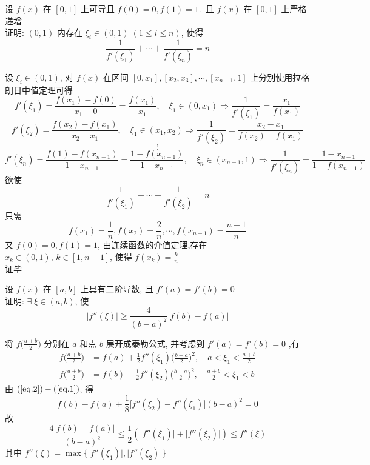 \documentclass[color=green,titlestyle=hang]{elegantbook}%
\begin{document}
\begin{exercise}设 $f(x)$ 在 $[0,1]$ 上可导且 $f(0)=0,f(1)=1$.\, 且 $f(x)$ 在 $[0,1]$ 上严格递增\\
证明: $(0,1)$ 内存在 $\xi_i\in(0,1)\;(1\leqslant i\leqslant n)$, 使得\[\frac{1}{f'(\xi_1)}+\cdots+\frac{1}{f'(\xi_n)}=n\]
\end{exercise}\begin{newproof}
设 $\xi_i\in(0,1)$, 对 $f(x)$ 在区间 $[0,x_1], [x_2,x_3], \cdots, [x_{n-1},1]$ 上分别使用拉格朗日中值定理可得
\[f'(\xi_1)=\frac{f(x_1)-f(0)}{x_1-0}=\frac{f(x_1)}{x_1},\quad \xi_1\in(0,x_1)\Longrightarrow\frac{1}{f'(\xi_1)}=\frac{x_1}{f(x_1)}\]
\[f'(\xi_2)=\frac{f(x_2)-f(x_1)}{x_2-x_1},\quad \xi_1\in(x_1,x_2)\Longrightarrow\frac{1}{f'(\xi_2)}=\frac{x_2-x_1}{f(x_2)-f(x_1)}\]
\[\vdots\]
\[f'(\xi_n)=\frac{f(1)-f(x_{n-1})}{1-x_{n-1}}=\frac{1-f(x_{n-1})}{1-x_{n-1}},\quad \xi_n\in(x_{n-1},1)\Longrightarrow\frac{1}{f'(\xi_n)}=\frac{1-x_{n-1}}{1-f(x_{n-1})}\]	
欲使\[\frac{1}{f'(\xi_1)}+\cdots+\frac{1}{f'(\xi_2)}=n\]
只需\[f(x_1)=\frac{1}{n},f(x_2)=\frac{2}{n},\cdots,f(x_{n-1})=\frac{n-1}{n}\] 
又 $f(0)=0,f(1)=1$, 由连续函数的介值定理,存在 $x_k\in(0,1),\,k\in[1,n-1]$, 使得 $f(x_k)=\frac{k}{n}$ \\
证毕
\end{newproof}

\begin{exercise}设 $f(x)$ 在 $[a,b]$ 上具有二阶导数, 且 $f'(a)=f'(b)=0$ \\
证明:  $\exists\;\xi\in(a,b)$, 使 
\begin{equation*}\big|f''(\xi)\big|\geqslant\frac{4}{(b-a)^2}\big|f(b)-f(a)\big|\end{equation*}	
\end{exercise}\begin{Solution} 将 $\displaystyle f\bigg(\frac{a+b}{2}\bigg)$ 分别在 $a$ 和点 $b$ 展开成泰勒公式, 并考虑到 $f'(a)=f'(b)=0$ ,有
\begin{align}f\bigg(\frac{a+b}{2}\bigg)&=f(a)+\frac{1}{2}f''(\xi_1)\bigg(\frac{b-a}{2}\bigg)^2,\quad a<\xi_1<\frac{a+b}{2}\label{eq.1}\\
f\bigg(\frac{a+b}{2}\bigg)&=f(b)+\frac{1}{2}f''(\xi_2)\bigg(\frac{b-a}{2}\bigg)^2,\quad \frac{a+b}{2}<\xi_1<b\label{eq.2}
\end{align}
由 $(\ref{eq.2})-(\ref{eq.1})$, 得
\begin{equation*}f(b)-f(a)+\frac{1}{8}\big[f''(\xi_2)-f''(\xi_1)\big](b-a)^2=0\end{equation*}
故\begin{equation*}\frac{4\big|f(b)-f(a)\big|}{(b-a)^2}\leqslant\frac{1}{2}\left(\big|f''(\xi_1)\big|+\big|f''(\xi_2)\big|\right)\leqslant f''(\xi)\end{equation*}
其中 $f''(\xi)=\max\Big\{\big|f''(\xi_1)\big|,\big|f''(\xi_2)\big|\Big\}$
\end{Solution}
\end{document}
